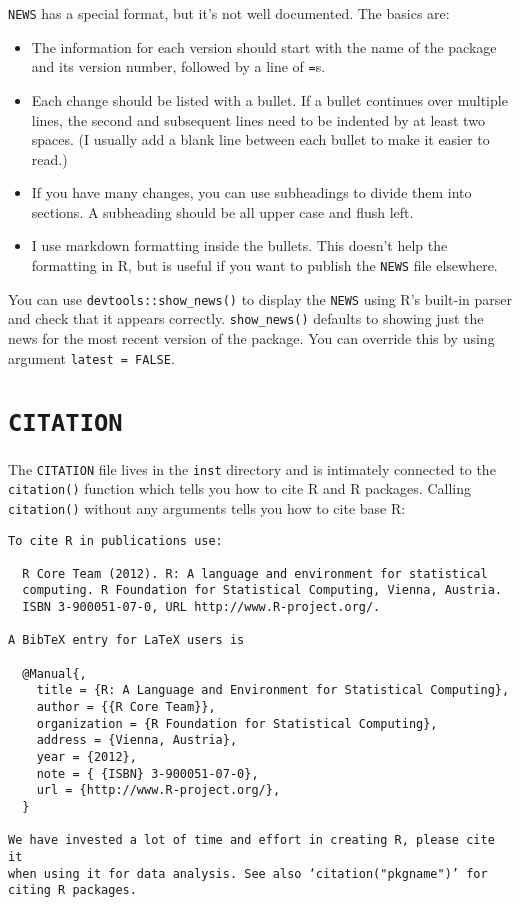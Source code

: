 \texttt{NEWS} has a special format, but it's not well documented. The
basics are:

\begin{itemize}
\item
  The information for each version should start with the name of the
  package and its version number, followed by a line of \texttt{=}s.
\item
  Each change should be listed with a bullet. If a bullet continues over
  multiple lines, the second and subsequent lines need to be indented by
  at least two spaces. (I usually add a blank line between each bullet
  to make it easier to read.)
\item
  If you have many changes, you can use subheadings to divide them into
  sections. A subheading should be all upper case and flush left.
\item
  I use markdown formatting inside the bullets. This doesn't help the
  formatting in R, but is useful if you want to publish the
  \texttt{NEWS} file elsewhere.
\end{itemize}

You can use \texttt{devtools::show\_news()} to display the \texttt{NEWS}
using R's built-in parser and check that it appears correctly.
\texttt{show\_news()} defaults to showing just the news for the most
recent version of the package. You can override this by using argument
\texttt{latest = FALSE}.

\section{\texttt{CITATION}}

The \texttt{CITATION} file lives in the \texttt{inst} directory and is
intimately connected to the \texttt{citation()} function which tells you
how to cite R and R packages. Calling \texttt{citation()} without any
arguments tells you how to cite base R:

\begin{verbatim}
To cite R in publications use:

  R Core Team (2012). R: A language and environment for statistical
  computing. R Foundation for Statistical Computing, Vienna, Austria.
  ISBN 3-900051-07-0, URL http://www.R-project.org/.

A BibTeX entry for LaTeX users is

  @Manual{,
    title = {R: A Language and Environment for Statistical Computing},
    author = {{R Core Team}},
    organization = {R Foundation for Statistical Computing},
    address = {Vienna, Austria},
    year = {2012},
    note = { {ISBN} 3-900051-07-0},
    url = {http://www.R-project.org/},
  }

We have invested a lot of time and effort in creating R, please cite it
when using it for data analysis. See also ‘citation("pkgname")’ for
citing R packages.
\end{verbatim}

